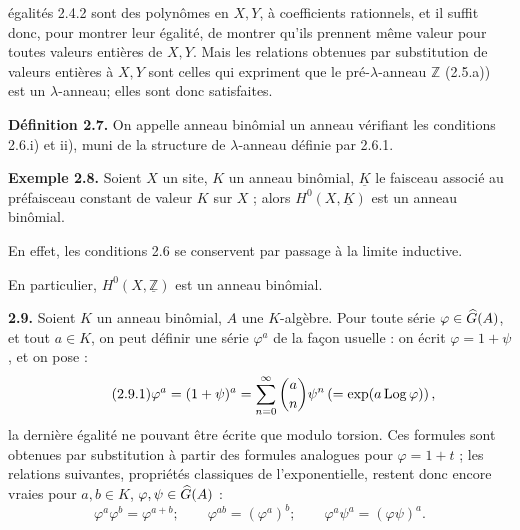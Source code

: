 égalités 2.4.2 sont des polynômes en \(X,Y\), à coefficients rationnels, et il suffit donc, pour montrer leur égalité, de montrer qu'ils prennent même valeur pour toutes valeurs entières de \(X,Y\). Mais les relations obtenues par substitution de valeurs entières à \(X,Y\) sont celles qui expriment que le pré-\(\lambda\)-anneau \(\mathbb Z\) (2.5.a)) est un \(\lambda\)-anneau; elles sont donc satisfaites.

\textbf{Définition 2.7.} On appelle anneau binômial un anneau vérifiant les conditions 2.6.i) et ii), muni de la structure de \(\lambda\)-anneau définie par 2.6.1.

\textbf{Exemple 2.8.} Soient \(X\) un site, \(K\) un anneau binômial, \(\underline{K}\) le faisceau associé au préfaisceau constant de valeur \(K\) sur \(X\) ; alors \(H^0(X,\underline{K})\) est un anneau binômial.

En effet, les conditions 2.6 se conservent par passage à la limite inductive.

En particulier, \(H^0(X,\underline{\mathbb Z})\) est un anneau binômial.

\textbf{2.9.} Soient \(K\) un anneau binômial, \(A\) une \(K\)-algèbre. Pour toute série \(\varphi\in\Ghat(A)\), et tout \(a\in K\), on peut définir une série \(\varphi^a\) de la façon usuelle : on écrit \(\varphi=1+\psi\), et on pose :
\begin{equation}\tag{2.9.1}
  \varphi^a=(1+\psi)^a
  =
  \sum_{n=0}^{\infty}\binom{a}{n}\psi^n
  \left(=\exp(a\Log\varphi)\right),
\end{equation}
la dernière égalité ne pouvant être écrite que modulo torsion. Ces formules sont obtenues par substitution à partir des formules analogues pour \(\varphi=1+t\) ; les relations suivantes, propriétés classiques de l'exponentielle, restent donc encore vraies pour \(a,b\in K\), \(\varphi,\psi\in\Ghat(A)\) :
\begin{equation}\tag{2.9.2}
  \varphi^a\varphi^b=\varphi^{a+b};\qquad
  \varphi^{ab}=(\varphi^a)^b;\qquad
  \varphi^a\psi^a=(\varphi\psi)^a .
\end{equation}



\providecommand{\Ghat}{\widehat G}
\providecommand{\Gg}{\widehat G_g}
\providecommand{\Gcirc}{\widehat G_{\circ}}
\providecommand{\Gnabla}{\widehat G_{\nabla}}
\providecommand{\Grhat}{\widehat{\operatorname{Gr}}}
\providecommand{\Log}{\operatorname{Log}}
\providecommand{\Fil}{\operatorname{Fil}}
\providecommand{\eps}{\varepsilon}
\renewcommand{\id}{\operatorname{id}}
\providecommand{\Sym}{\operatorname{Sym}}
\providecommand{\Mon}{\operatorname{Mon}}


